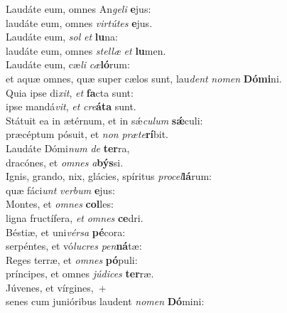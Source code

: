 \evenverse Laudáte eum, omnes An\textit{ge}\textit{li} \textbf{e}jus:~\*\\
\evenverse laudáte eum, omnes \textit{vir}\textit{tú}\textit{tes} \textbf{e}jus.\\
\oddverse Laudáte eum, \textit{sol} \textit{et} \textbf{lu}na:~\*\\
\oddverse laudáte eum, omnes \textit{stel}\textit{læ} \textit{et} \textbf{lu}men.\\
\evenverse Laudáte eum, cæ\textit{li} \textit{cæ}\textbf{ló}rum:~\*\\
\evenverse et aquæ omnes, quæ super cælos sunt, lau\textit{dent} \textit{no}\textit{men} \textbf{Dó}\textbf{mi}ni.\\
\oddverse Quia ipse di\textit{xit}, \textit{et} \textbf{fa}cta sunt:~\*\\
\oddverse ipse mandá\textit{vit}, \textit{et} \textit{cre}\textbf{á}\textbf{ta} sunt.\\
\evenverse Státuit ea in ætérnum, et in sǽ\textit{cu}\textit{lum} \textbf{sǽ}culi:~\*\\
\evenverse præcéptum pósuit, et \textit{non} \textit{præ}\textit{te}\textbf{rí}bit.\\
\oddverse Laudáte Dómi\textit{num} \textit{de} \textbf{ter}ra,~\*\\
\oddverse dracónes, et \textit{om}\textit{nes} \textit{a}\textbf{býs}si.\\
\evenverse Ignis, grando, nix, glácies, spíritus \textit{pro}\textit{cel}\textbf{lá}rum:~\*\\
\evenverse quæ fáci\textit{unt} \textit{ver}\textit{bum} \textbf{e}jus:\\
\oddverse Montes, et \textit{om}\textit{nes} \textbf{col}les:~\*\\
\oddverse ligna fructífera, \textit{et} \textit{om}\textit{nes} \textbf{ce}dri.\\
\evenverse Béstiæ, et uni\textit{vér}\textit{sa} \textbf{pé}cora:~\*\\
\evenverse serpéntes, et vó\textit{lu}\textit{cres} \textit{pen}\textbf{ná}tæ:\\
\oddverse Reges terræ, et \textit{om}\textit{nes} \textbf{pó}puli:~\*\\
\oddverse príncipes, et omnes \textit{jú}\textit{di}\textit{ces} \textbf{ter}ræ.\\
\evenverse Júvenes, et vírgines,~+\\
\evenverse  senes cum junióribus laudent \textit{no}\textit{men} \textbf{Dó}mini:~\*\\
